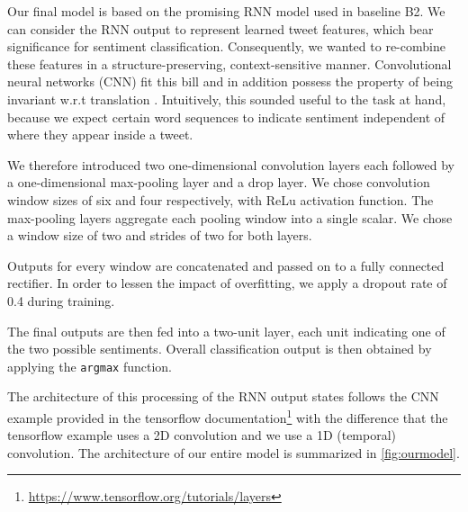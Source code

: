 \documentclass[10pt,conference,compsocconf]{IEEEtran}
\begin{document}
Our final model is based on the promising RNN model used in baseline B2.
We can consider the RNN output to
represent learned tweet features, which bear significance for
sentiment classification. Consequently, we wanted to re-combine these
features in a structure-preserving, context-sensitive
manner. Convolutional neural networks (CNN) fit this bill and in addition
possess the property of being invariant w.r.t
translation \cite{cnn_invariance}.
Intuitively, this sounded useful to the task at hand,
because we expect certain word sequences to indicate sentiment
independent of where they appear inside a tweet.

We therefore introduced two one-dimensional convolution layers each
followed by a one-dimensional max-pooling layer and a drop layer. We chose convolution
window sizes of six and four respectively, with ReLu
activation function. The max-pooling layers aggregate each pooling window into
a single scalar. We chose a window size of two and strides of two for
both layers.

Outputs for every window are concatenated and passed on
to a fully connected rectifier. In order to lessen the impact of
overfitting, we apply a dropout rate of 0.4 during training.

The final outputs are then fed into a two-unit layer, each unit
indicating one of the two possible sentiments. Overall classification
output is then obtained by applying the \texttt{argmax} function.

The architecture of this processing of the RNN output states follows the CNN
example provided in the tensorflow documentation\footnote{\url{https://www.tensorflow.org/tutorials/layers}} with the difference that the
tensorflow example uses a 2D convolution and we use a 1D (temporal) convolution.
The architecture of our entire model is summarized in \autoref{fig:ourmodel}.
\end{document}
